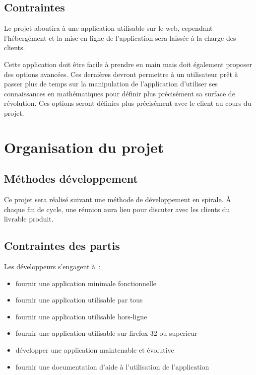 \documentclass{scrartcl}
\begin{document}
	\subsection{Contraintes}
		Le projet aboutira à une application utilisable sur le web, cependant l'hébergément et la mise en ligne de l'application sera laissée à la charge des clients.
		
		Cette application doit être facile à prendre en main mais doit également proposer des options avancées. Ces dernières devront permettre à un utilisateur prêt à passer plus de temps sur la manipulation de l'application d'utiliser ses connaissances en mathématiques pour définir plus précisément sa surface de révolution. Ces options seront définies plus précisément avec le client au cours du projet.




\section{Organisation du projet}


	\subsection{Méthodes développement}
		Ce projet sera réalisé suivant une méthode de développement en spirale.
		\`A chaque fin de cycle, une réunion aura lieu pour discuter avec les clients du livrable produit.
	
	\subsection{Contraintes des partis}
		Les développeurs s'engagent à~:
			
		\medskip
		
		\begin{itemize}
			\item fournir une application minimale fonctionnelle
			\item fournir une application utilisable par tous
			\item fournir une application utilisable hors-ligne
			\item fournir une application utilisable sur firefox 32 ou superieur
			\item développer une application maintenable et évolutive
			\item fournir une documentation d'aide à l'utilisation de l'application
		\end{itemize}
		
\end{document}
